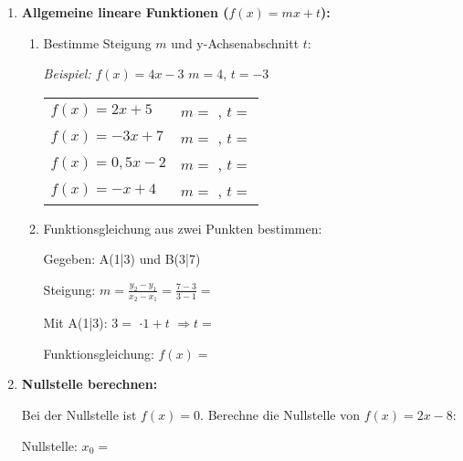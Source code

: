 \begin{enumerate}[label=\arabic*.,resume]
\begin{enumerate}[label=\alph*)]
    \end{enumerate}

    \item \textbf{Allgemeine lineare Funktionen ($f(x) = mx + t$):}

    \begin{enumerate}[label=\alph*)]
        \item Bestimme Steigung $m$ und y-Achsenabschnitt $t$:

        \textit{Beispiel:} $f(x) = 4x - 3$ \hspace{2cm} $m = 4$, $t = -3$

        \vspace{0.5cm}
        \begin{tabular}{ll}
            $f(x) = 2x + 5$ & $m = $ \underline{\hspace{2cm}}, $t = $ \underline{\hspace{2cm}} \\[1ex]
            $f(x) = -3x + 7$ & $m = $ \underline{\hspace{2cm}}, $t = $ \underline{\hspace{2cm}} \\[1ex]
            $f(x) = 0,5x - 2$ & $m = $ \underline{\hspace{2cm}}, $t = $ \underline{\hspace{2cm}} \\[1ex]
            $f(x) = -x + 4$ & $m = $ \underline{\hspace{2cm}}, $t = $ \underline{\hspace{2cm}}
        \end{tabular}

        \vspace{1cm}

        \item Funktionsgleichung aus zwei Punkten bestimmen:

        Gegeben: A(1|3) und B(3|7)

        Steigung: $m = \frac{y_2 - y_1}{x_2 - x_1} = \frac{7-3}{3-1} = $ \underline{\hspace{3cm}}

        Mit A(1|3): $3 = $ \underline{\hspace{2cm}} $ \cdot 1 + t$ \hspace{1cm} $\Rightarrow t = $ \underline{\hspace{3cm}}

        Funktionsgleichung: $f(x) = $ \underline{\hspace{6cm}}

    \end{enumerate}

    \item \textbf{Nullstelle berechnen:}

    Bei der Nullstelle ist $f(x) = 0$. Berechne die Nullstelle von $f(x) = 2x - 8$:

    \vspace{2.5cm}

    Nullstelle: $x_0 = $ \underline{\hspace{4cm}}

\end{enumerate}